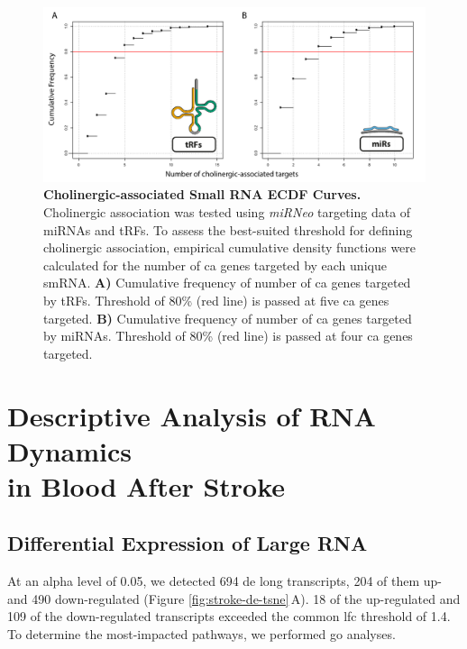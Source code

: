 \begin{figure}
\includegraphics[width=\textwidth]{figures/cholino-ecdfs}
\caption[Cholinergic-associated Small RNA ECDF Curves.]{\textbf{Cholinergic-associated Small RNA ECDF Curves.} Cholinergic association was tested using \emph{miRNeo} targeting data of miRNAs and tRFs. To assess the best-suited threshold for defining cholinergic association, empirical cumulative density functions were calculated for the number of \acf{ca} genes targeted by each unique smRNA. \textbf{A)} Cumulative frequency of number of \ac{ca} genes targeted by tRFs. Threshold of 80\% (red line) is passed at five \ac{ca} genes targeted. \textbf{B)} Cumulative frequency of number of \ac{ca} genes targeted by miRNAs. Threshold of 80\% (red line) is passed at four \ac{ca} genes targeted.
\label{fig:cholino-ecdfs}}
\end{figure}

\newpage

\section[Descriptive Analysis of RNA Dynamics in Blood After Stroke]{Descriptive Analysis of RNA Dynamics \\in Blood After Stroke}

\subsection{Differential Expression of Large RNA} \label{sec:stroke:mrna}
At an alpha level of 0.05, we detected 694 \acf{de} long transcripts, 204 of them up- and 490 down-regulated (Figure \ref{fig:stroke-de-tsne}\,A). 18 of the up-regulated and 109 of the down-regulated transcripts exceeded the common \acf{lfc} threshold of 1.4. To determine the most-impacted pathways, we performed \ac{go} analyses.

